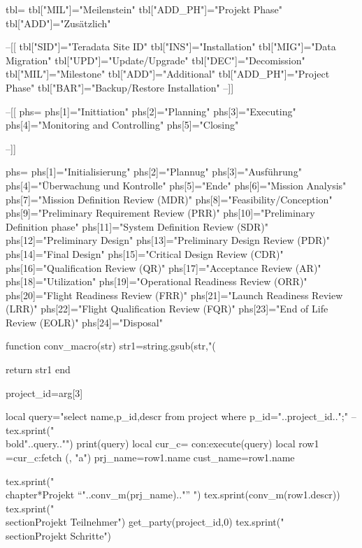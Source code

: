 \documentclass[a4paper,12pt]{report}
\begin{document}
\begin{luacode*}
tbl={}
tbl["MIL"]="Meilenstein"
tbl["ADD_PH"]="Projekt Phase"
tbl["ADD"]="Zusätzlich"

--[[
tbl["SID"]="Teradata Site ID"
tbl["INS"]="Installation"
tbl["MIG"]="Data Migration"
tbl["UPD"]="Update/Upgrade"
tbl["DEC"]="Decomission"
tbl["MIL"]="Milestone"
tbl["ADD"]="Additional"
tbl["ADD_PH"]="Project Phase"
tbl["BAR"]="Backup/Restore Installation"
--]]



--[[
phs={}
phs[1]="Inittiation"
phs[2]="Planning"
phs[3]="Executing"
phs[4]="Monitoring and Controlling"
phs[5]="Closing"

--]]


phs={}
phs[1]="Initialisierung"
phs[2]="Plannug"
phs[3]="Ausführung"
phs[4]="Überwachung und Kontrolle"
phs[5]="Ende"
phs[6]="Mission Analysis"
phs[7]="Mission Definition Review (MDR)"
phs[8]="Feasibility/Conception"
phs[9]="Preliminary Requirement Review (PRR)"
phs[10]="Preliminary Definition phase"
phs[11]="System Definition Review (SDR)"
phs[12]="Preliminary Design"
phs[13]="Preliminary Design Review (PDR)"
phs[14]="Final Design"
phs[15]="Critical Design Review (CDR)"
phs[16]="Qualification Review (QR)"
phs[17]="Acceptance Review (AR)"
phs[18]="Utilization"
phs[19]="Operational Readiness Review (ORR)"
phs[20]="Flight Readiness Review (FRR)"
phs[21]="Launch Readiness Review (LRR)"
phs[22]="Flight Qualification Review (FQR)"
phs[23]="End of Life Review (EOLR)"
phs[24]="Disposal"



function conv_macro(str)
str1=string.gsub(str,"$$(%

return str1
end


project_id=arg[3]

   local query="select name,p_id,descr from project where p_id="..project_id..";"
   --tex.sprint("\\bold{"..query.."}\n")
   print(query)
        local cur_c= con:execute(query)
        local   row1 =cur_c:fetch ({}, "a")
	prj_name=row1.name
	cust_name=row1.name

   

    tex.sprint("\\chapter*{Projekt ``"..conv_m(prj_name).."'' }")
    tex.sprint(conv_m(row1.descr))
    tex.sprint("\\section{Projekt Teilnehmer}")
    get_party(project_id,0)
    tex.sprint("\\section{Projekt Schritte}")



\end{luacode*}
\end{document}

